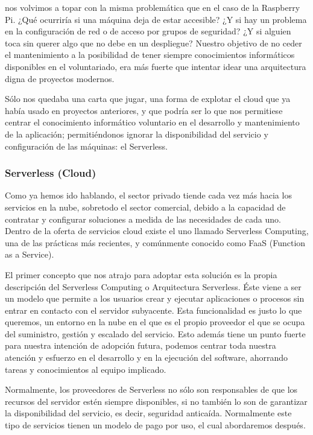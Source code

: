 nos volvimos a topar con la misma problemática que en el caso de la Raspberry Pi. ¿Qué ocurriría si una máquina deja de estar accesible? ¿Y si hay un problema en la configuración de red o de acceso por grupos de seguridad? ¿Y si alguien toca sin querer algo que no debe en un despliegue? Nuestro objetivo de no ceder el mantenimiento a la posibilidad de tener siempre conocimientos informáticos disponibles en el voluntariado, era más fuerte que intentar idear una arquitectura digna de proyectos modernos.
\par Sólo nos quedaba una carta que jugar, una forma de explotar el cloud que ya había usado en proyectos anteriores, y que podría ser lo que nos permitiese centrar el conocimiento informático voluntario en el desarrollo y mantenimiento de la aplicación; permitiéndonos ignorar la disponibilidad del servicio y configuración de las máquinas: el Serverless.
\clearpage
\subsubsection{Serverless (Cloud)}
Como ya hemos ido hablando, el sector privado tiende cada vez más hacia los servicios en la nube, sobretodo el sector comercial, debido a la capacidad de contratar y configurar soluciones a medida de las necesidades de cada uno. Dentro de la oferta de servicios cloud existe el uno llamado Serverless Computing, una de las prácticas más recientes, y comúnmente conocido como FaaS (Function as a Service).
\par El primer concepto que nos atrajo para adoptar esta solución es la propia descripción del Serverless Computing o Arquitectura Serverless. Éste viene a ser un modelo que permite a los usuarios crear y ejecutar aplicaciones o procesos sin entrar en contacto con el servidor subyacente. Esta funcionalidad es justo lo que queremos, un entorno en la nube en el que es el propio proveedor el que se ocupa del suministro, gestión y escalado del servicio. Esto además tiene un punto fuerte para nuestra intención de adopción futura, podemos centrar toda nuestra atención y esfuerzo en el desarrollo y en la ejecución del software, ahorrando tareas y conocimientos al equipo implicado.
\par Normalmente, los proveedores de Serverless no sólo son responsables de que los recursos del servidor estén siempre disponibles, si no también lo son de garantizar la disponibilidad del servicio, es decir, seguridad anticaída. Normalmente este tipo de servicios tienen un modelo de pago por uso, el cual abordaremos después.
